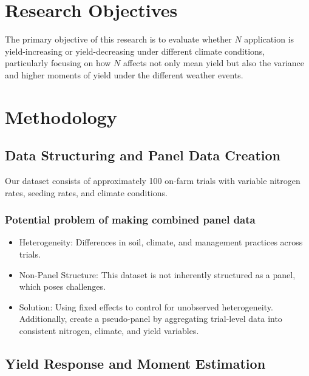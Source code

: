 \documentclass[
  letterpaper,
  DIV=11,
  numbers=noendperiod]{scrartcl}
\begin{document}
\section{Research Objectives}\label{research-objectives}

The primary objective of this research is to evaluate whether \(N\)
application is yield-increasing or yield-decreasing under different
climate conditions, particularly focusing on how \(N\) affects not only
mean yield but also the variance and higher moments of yield under the
different weather events.

\section{Methodology}\label{methodology}

\subsection{Data Structuring and Panel Data
Creation}\label{data-structuring-and-panel-data-creation}

Our dataset consists of approximately 100 on-farm trials with variable
nitrogen rates, seeding rates, and climate conditions.

\subsubsection{Potential problem of making combined panel
data}\label{potential-problem-of-making-combined-panel-data}

\begin{itemize}
\item
  Heterogeneity: Differences in soil, climate, and management practices
  across trials.
\item
  Non-Panel Structure: This dataset is not inherently structured as a
  panel, which poses challenges.
\item
  Solution: Using fixed effects to control for unobserved heterogeneity.
  Additionally, create a pseudo-panel by aggregating trial-level data
  into consistent nitrogen, climate, and yield variables.
\end{itemize}

\subsection{Yield Response and Moment
Estimation}\label{yield-response-and-moment-estimation}
\end{document}
